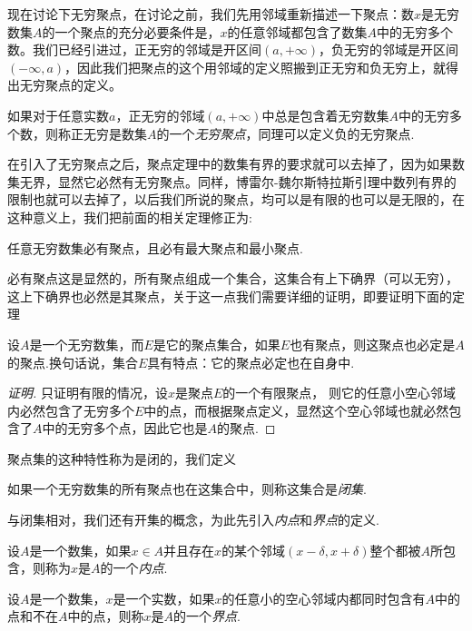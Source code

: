 现在讨论下无穷聚点，在讨论之前，我们先用邻域重新描述一下聚点：数$x$是无穷数集$A$的一个聚点的充分必要条件是，$x$的任意邻域都包含了数集$A$中的无穷多个数。我们已经引进过，正无穷的邻域是开区间$(a,+\infty)$，负无穷的邻域是开区间$(-\infty,a)$，因此我们把聚点的这个用邻域的定义照搬到正无穷和负无穷上，就得出无穷聚点的定义。

\begin{definition}
  如果对于任意实数$a$，正无穷的邻域$(a,+\infty)$中总是包含着无穷数集$A$中的无穷多个数，则称正无穷是数集$A$的一个\emph{无穷聚点}，同理可以定义负的无穷聚点. 
\end{definition}

在引入了无穷聚点之后，聚点定理中的数集有界的要求就可以去掉了，因为如果数集无界，显然它必然有无穷聚点。同样，博雷尔-魏尔斯特拉斯引理中数列有界的限制也就可以去掉了，以后我们所说的聚点，均可以是有限的也可以是无限的，在这种意义上，我们把前面的相关定理修正为:
\begin{theorem}
  任意无穷数集必有聚点，且必有最大聚点和最小聚点.
\end{theorem}
必有聚点这是显然的，所有聚点组成一个集合，这集合有上下确界（可以无穷），这上下确界也必然是其聚点，关于这一点我们需要详细的证明，即要证明下面的定理
\begin{theorem}
  设$A$是一个无穷数集，而$E$是它的聚点集合，如果$E$也有聚点，则这聚点也必定是$A$的聚点.换句话说，集合$E$具有特点：它的聚点必定也在自身中.
\end{theorem}

\begin{proof}[证明]
 只证明有限的情况，设$x$是聚点$E$的一个有限聚点， 则它的任意小空心邻域内必然包含了无穷多个$E$中的点，而根据聚点定义，显然这个空心邻域也就必然包含了$A$中的无穷多个点，因此它也是$A$的聚点.
\end{proof}

聚点集的这种特性称为是闭的，我们定义
\begin{definition}
  如果一个无穷数集的所有聚点也在这集合中，则称这集合是\emph{闭集}.
\end{definition}

与闭集相对，我们还有开集的概念，为此先引入\emph{内点}和\emph{界点}的定义.
\begin{definition}
  设$A$是一个数集，如果$x \in A$并且存在$x$的某个邻域$(x-\delta,x+\delta)$整个都被$A$所包含，则称为$x$是$A$的一个\emph{内点}.
\end{definition}

\begin{definition}
  设$A$是一个数集，$x$是一个实数，如果$x$的任意小的空心邻域内都同时包含有$A$中的点和不在$A$中的点，则称$x$是$A$的一个\emph{界点}.
\end{definition}

